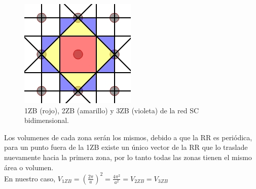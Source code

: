 \documentclass[a4paper]{article}
\begin{document}
\begin{figure}[H]
  \centering
  \includegraphics[width=0.3\linewidth,height=0.3\linewidth]{zb.png}
  \caption{1ZB (rojo), 2ZB (amarillo) y 3ZB (violeta) de la red SC bidimensional.}
  \label{fig:zb}
\end{figure}

Los volumenes de cada zona ser\'an los mismos, debido a que la RR es peri\'odica, para un punto fuera de la 1ZB existe un \'unico vector de la RR que lo traslade nuevamente hacia la primera zona, por lo tanto todas las zonas tienen el mismo \'area o volumen.\\

En nuestro caso, $V_{1ZB} = (\frac{2 \pi}{a})^{2} = \frac{4 \pi^{2}}{a^{2}} = V_{2ZB} = V_{3ZB}$

\subsection{}
\end{document}
